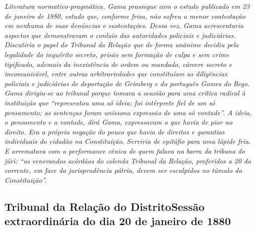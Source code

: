 \begin{resumo}
\emph{Literatura normativo-pragmática. Gama prossegue com o estudo
publicado em 23 de janeiro de 1880, estudo que, conforme frisa, não sofreu a menor
contestação em nenhuma de suas denúncias e sustentações. Dessa vez, Gama
acrescentaria aspectos que demonstravam o conluio das autoridades
policiais e judiciárias. Discutiria o papel do Tribunal da Relação que
de forma unânime decidiu pela legalidade do inquérito secreto, prisão
sem formação de culpa e sem crime tipificado, ademais da inexistência de
ordem ou mandado, cárcere secreto e incomunicável, entre outras
arbitrariedades que constituíam as diligências policiais e judiciárias de
deportação de Grimberg e do português Gomes do Rego. Gama dirigiu-se ao
tribunal porque tomava a ocasião para uma crítica radical à instituição
que ``representou uma só ideia; foi intérprete fiel de
um só pensamento; as sentenças foram uníssona expressão de uma só
vontade''. A ideia, o pensamento e a vontade, dirá Gama, expressavam o
que havia de pior no direito. Era a própria negação do pouco que havia
de direitos e garantias individuais do cidadão na Constituição. Serviria
de epitáfio para uma lápide fria. E arrematava com a performance cênica
de quem falava na barra da tribuna do júri: ``os venerandos acórdãos do
colendo Tribunal da Relação, proferidos a 20 do corrente, em face da
jurisprudência pátria, devem ser esculpidos no túmulo da Constituição''.
}
\end{resumo}

\subsection{Tribunal da Relação do Distrito\break Sessão extraordinária do dia 20 de janeiro de 1880}

